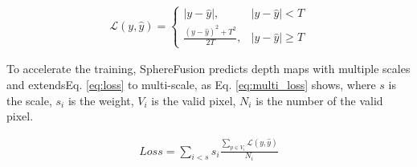 \begin{align}
	\label{eq:loss}
	\mathcal{L}(y,\hat{y}) = 
	\begin{cases}
		|y-\hat{y}|, &|y-\hat{y}|<T \\
		\frac{(y-\hat{y})^2+T^2}{2T}, &|y-\hat{y}|\ge T
	\end{cases}
\end{align}

To accelerate the training, SphereFusion predicts depth maps with multiple scales and extendsEq. \ref{eq:loss} to multi-scale, as Eq. \ref{eq:multi_loss} shows, where $s$ is the scale, $s_i$ is the weight, $V_i$ is the valid pixel, $N_i$ is the number of the valid pixel.

\begin{align}
	\label{eq:multi_loss}
	Loss = \sum_{i<s}{s_i \frac{\sum_{p \in V_i}{\mathcal{L}(y,\hat{y})}}{N_i}  }
\end{align}

